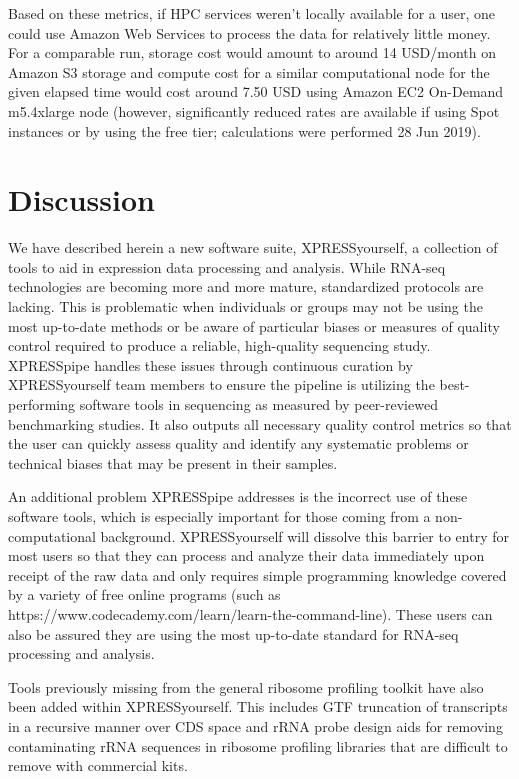 \documentclass[11pt, a4paper, oneside]{article}
\begin{document}
Based on these metrics, if HPC services weren't locally available for a user, one could use Amazon Web Services to process the data for relatively little money. For a comparable run, storage cost would amount to around 14 USD/month on Amazon S3 storage and compute cost for a similar computational node for the given elapsed time would cost around 7.50 USD using Amazon EC2 On-Demand m5.4xlarge node (however, significantly reduced rates are available if using Spot instances or by using the free tier; calculations were performed 28 Jun 2019).


\section{Discussion}
We have described herein a new software suite, XPRESSyourself, a collection of tools to aid in expression data processing and analysis. While RNA-seq technologies are becoming more and more mature, standardized protocols are lacking. This is problematic when individuals or groups may not be using the most up-to-date methods or be aware of particular biases or measures of quality control required to produce a reliable, high-quality sequencing study. XPRESSpipe handles these issues through continuous curation by XPRESSyourself team members to ensure the pipeline is utilizing the best-performing software tools in sequencing as measured by peer-reviewed benchmarking studies. It also outputs all necessary quality control metrics so that the user can quickly assess quality and identify any systematic problems or technical biases that may be present in their samples. \par

An additional problem XPRESSpipe addresses is the incorrect use of these software tools, which is especially important  for those coming from a non-computational background. XPRESSyourself will dissolve this barrier to entry for most users so that they can process and analyze their data immediately upon receipt of the raw data and only requires simple programming knowledge covered by a variety of free online programs (such as https://www.codecademy.com/learn/learn-the-command-line). These users can also be assured they are using the most up-to-date standard for RNA-seq processing and analysis. \par

Tools previously missing from the general ribosome profiling toolkit have also been added within XPRESSyourself. This includes GTF truncation of transcripts in a recursive manner over CDS space and rRNA probe design aids for removing contaminating rRNA sequences in ribosome profiling libraries that are difficult to remove with commercial kits. \par
\end{document}
